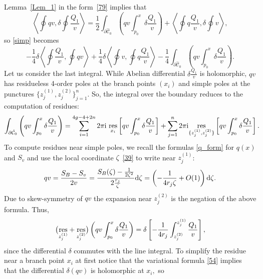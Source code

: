 \documentclass[pdftex]{sigma}
\numberwithin{equation}{section}
\theoremstyle{definition}
\begin{document}
Lemma~\ref{Lem_1} in the form~\eqref{79} implies that
\begin{equation*}
\left\langle \oint {qv},\delta \oint \frac{Q_1}{v}\right\rangle = \frac{1}{2}\int_{\partial \hat{\mathcal{C}}_0}\left( qv
\int^x_{p_0} \delta \frac{Q_1}{v}\right)+\left\langle \oint q\frac{Q_1}{v},\delta \oint v\right\rangle, \end{equation*}
so \eqref{simp} becomes
\begin{equation}\label{pairs}-\frac{1}{4}\delta\left\langle \oint\frac{Q_1}{v},\oint {qv}\right\rangle +\frac{1}{4}\delta\left\langle \oint v, \oint q\frac{Q_1}{v}\right\rangle -\frac{1}{4}\int_{\partial \hat{\mathcal{C}}_0}\left( qv
\int^x_{p_0} \delta \frac{Q_1}{v}\right).\end{equation}
Let us consider the last integral. While Abelian differential $\delta\frac{Q_1}{v}$ is holomorphic, $qv$ has residueless 4-order poles at the branch points $(x_i)$ and simple poles at the punctures $\{z^{(1)}_j, z^{(2)}_j \}^n_{j=1}$. So, the integral over the boundary reduces to the computation of residues:
\begin{gather}\label{182}\int_{\partial \hat{\mathcal{C}}_0}\Bigg( qv
\int^x_{p_0} \delta \frac{Q_1}{v}\Bigg)=\sum^{4g-4+2n}_{i=1}2\pi{\rm i} \ \underset{x_i}{\rm res}\left[qv \int^x_{p_0} \delta\frac{Q_1}{v}\right]+\sum^{n}_{j=1}2\pi{\rm i} \underset{\{z^{(1)}_j, z^{(2)}_j \}}{\rm res}\left[qv \int^x_{p_0} \delta \frac{Q_1}{v}\right].\!\!\!\end{gather}
To compute residues near simple poles, we recall the formulas \eqref{q_form} for $q(x)$ and $S_v$ and use the local coordinate $\zeta$~\eqref{39} to write near ${z}^{(1)}_j$:
\begin{equation*}%
 qv=\frac{S_B-S_v}{2v}=\frac{S_B(\zeta)-\frac{1}{2\zeta^2}}{2\frac{{r}_j}{\zeta}}{\rm d}\zeta=\left(-\frac{1}{4{r}_j \zeta} +O(1)\right) {\rm d}\zeta.
\end{equation*}
Due to skew-symmetry of $qv$ the expansion near ${z}^{(2)}_j$ is the negation of the above formula.
Thus,%
\begin{equation*}%
\big(\underset{z^{(1)}_j}{\rm res}+\underset{z^{(2)}_j}{\rm res} \big)\left(qv \int^x_{p_0}\delta\frac{Q_1}{v}\right)=\delta \left[-\frac{1}{4{r}_j}\int^{{z}^{(1)}_j}_{{z}^{(2)}_j}\frac{Q_1}{v}\right],\end{equation*}
since the differential $\delta$ commutes with the line integral. To simplify the residue near a branch point $x_i$ at first notice that the variational formula \eqref{54} implies that the differential $\delta (qv)$ is holomorphic at $x_i,$ so
\end{document}
